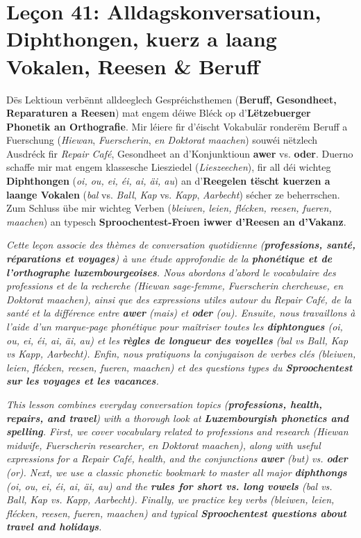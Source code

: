 \chapter[Leçon 41: Phonetik, Diphthongen, Vokallängt \& Reesen]{Leçon 41: Alldagskonversatioun, Diphthongen, kuerz a laang Vokalen, Reesen \& Beruff}

Dës Lektioun verbënnt alldeeglech Gespréichsthemen (\textbf{Beruff, Gesondheet, Reparaturen a Reesen}) mat engem déiwe Bléck op d'\textbf{Lëtzebuerger Phonetik an Orthografie}. Mir léiere fir d'éischt Vokabulär ronderëm Beruff a Fuerschung (\textit{Hiewan}, \textit{Fuerscherin}, \textit{en Doktorat maachen}) souwéi nëtzlech Ausdréck fir \textit{Repair Café}, Gesondheet an d'Konjunktioun \textbf{awer} vs. \textbf{oder}. Duerno schaffe mir mat engem klassesche Liesziedel (\textit{Lieszeechen}), fir all déi wichteg \textbf{Diphthongen} (\textit{oi, ou, ei, éi, ai, äi, au}) an d'\textbf{Reegelen tëscht kuerzen a laange Vokalen} (\textit{bal} vs. \textit{Ball}, \textit{Kap} vs. \textit{Kapp}, \textit{Aarbecht}) sécher ze beherrschen. Zum Schluss übe mir wichteg Verben (\textit{bleiwen, leien, flécken, reesen, fueren, maachen}) an typesch \textbf{Sproochentest-Froen iwwer d'Reesen an d'Vakanz}.

\textit{Cette leçon associe des thèmes de conversation quotidienne (\textbf{professions, santé, réparations et voyages}) à une étude approfondie de la \textbf{phonétique et de l'orthographe luxembourgeoises}. Nous abordons d'abord le vocabulaire des professions et de la recherche (\textit{Hiewan} sage-femme, \textit{Fuerscherin} chercheuse, \textit{en Doktorat maachen}), ainsi que des expressions utiles autour du \textit{Repair Café}, de la santé et la différence entre \textbf{awer} (mais) et \textbf{oder} (ou). Ensuite, nous travaillons à l'aide d'un marque-page phonétique pour maîtriser toutes les \textbf{diphtongues} (\textit{oi, ou, ei, éi, ai, äi, au}) et les \textbf{règles de longueur des voyelles} (\textit{bal} vs \textit{Ball}, \textit{Kap} vs \textit{Kapp}, \textit{Aarbecht}). Enfin, nous pratiquons la conjugaison de verbes clés (\textit{bleiwen, leien, flécken, reesen, fueren, maachen}) et des questions types du \textbf{Sproochentest sur les voyages et les vacances}.}

\textit{This lesson combines everyday conversation topics (\textbf{professions, health, repairs, and travel}) with a thorough look at \textbf{Luxembourgish phonetics and spelling}. First, we cover vocabulary related to professions and research (\textit{Hiewan} midwife, \textit{Fuerscherin} researcher, \textit{en Doktorat maachen}), along with useful expressions for a \textit{Repair Café}, health, and the conjunctions \textbf{awer} (but) vs. \textbf{oder} (or). Next, we use a classic phonetic bookmark to master all major \textbf{diphthongs} (\textit{oi, ou, ei, éi, ai, äi, au}) and the \textbf{rules for short vs. long vowels} (\textit{bal} vs. \textit{Ball}, \textit{Kap} vs. \textit{Kapp}, \textit{Aarbecht}). Finally, we practice key verbs (\textit{bleiwen, leien, flécken, reesen, fueren, maachen}) and typical \textbf{Sproochentest questions about travel and holidays}.}

